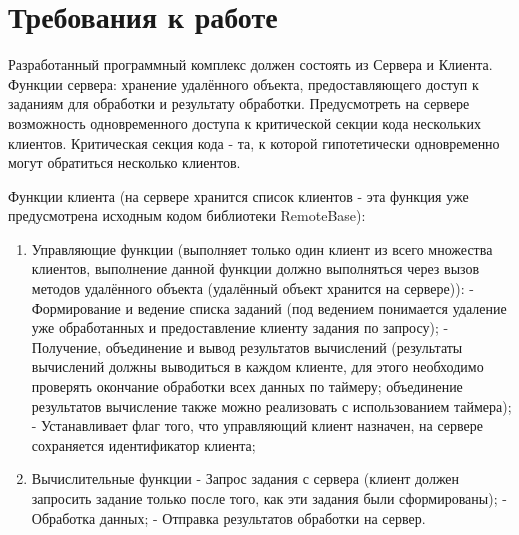 \documentclass[russian,utf8,pointsection]{eskdtext}
\begin{document}
	\maketitle
	\tableofcontents
	\newpage
	
	\section{Требования к работе}
	  Разработанный программный комплекс должен состоять из Сервера и Клиента.
	  Функции сервера: хранение удалённого объекта, предоставляющего доступ к заданиям для обработки и результату обработки. 
	  Предусмотреть на сервере возможность одновременного доступа к критической секции кода нескольких клиентов. Критическая секция кода - та, к которой гипотетически одновременно могут обратиться несколько клиентов.  
	  
	  Функции клиента (на сервере хранится список клиентов - эта функция уже предусмотрена исходным кодом библиотеки RemoteBase):
	  \begin{enumerate}
	  \item Управляющие функции (выполняет только один клиент из всего множества клиентов, выполнение данной функции должно выполняться через вызов методов удалённого объекта (удалённый объект хранится на сервере)):
	  \subitem - Формирование и ведение списка заданий (под ведением понимается удаление уже обработанных и предоставление клиенту задания по запросу);
	  \subitem - Получение, объединение и вывод результатов вычислений (результаты вычислений должны выводиться в каждом клиенте, для этого необходимо проверять окончание обработки всех данных по таймеру; объединение 
	  результатов вычисление также можно реализовать с использованием таймера);
	  \subitem - Устанавливает флаг того, что управляющий клиент назначен, на сервере сохраняется идентификатор клиента;
	  
	  \item Вычислительные функции
	  \subitem - Запрос задания с сервера (клиент должен запросить задание только после того, как эти задания были сформированы);
	  \subitem - Обработка данных;
	  \subitem - Отправка результатов обработки на сервер.
	\end{enumerate}
	\newpage 
	
\end{document}
